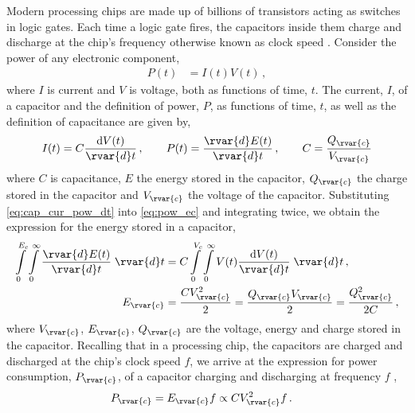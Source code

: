 Modern processing chips are made up of billions of transistors acting as switches in logic gates. Each time a logic gate fires, the capacitors inside them charge and discharge at the chip's frequency otherwise known as clock speed \cite{cpu_trnstor}. Consider the power of any electronic component,
\begin{align}\label{eq:pow_ec}
  P(t) & = I(t) V(t) \,,
\end{align}
where $ I $ is current and $ V $ is voltage, both as functions of time, $t$. The current, $ I $, of a capacitor and the definition of power, $ P $, as functions of time, $ t $, as well as the definition of capacitance are given by,
\begin{align}\label{eq:cap_cur_pow_dt}
  I(t) = C \dfrac{\mathrm{d}V(t)}{\rvar{d}t} \,, \qquad
  P(t) = \dfrac{\rvar{d}E(t)}{\rvar{d}t}\,, \qquad
  C = \dfrac{Q_\rvar{c}}{V_\rvar{c}}
\end{align}
where $ C $ is capacitance, $ E $ the energy stored in the capacitor, $Q_\rvar{c}$ the charge stored in the capacitor and $V_\rvar{c}$ the voltage of the capacitor. Substituting \cref{eq:cap_cur_pow_dt} into \cref{eq:pow_ec} and integrating twice, we obtain the expression for the energy stored in a capacitor,
\begin{subequations}
  \begin{align}\label{eq:e_cap}
    \int\limits_{0}^{E_{c}}\int\limits_{0}^{\infty} \dfrac{\rvar{d}E(t)}{\rvar{d}t}\; \rvar{d} t & = C \int\limits_{0}^{V_{c}}\int\limits_{0}^{\infty} V(t) \dfrac{\mathrm{d}V(t)}{\rvar{d}t}\; \rvar{d} t\,, \\
    E_{\rvar{c}}                                                                                 & = \dfrac{C V_{\rvar{c}}^{2}}{2}  = \dfrac{Q_\rvar{c} V_\rvar{c}}{2} = \dfrac{Q_\rvar{c}^2}{2C}\,,
  \end{align}
\end{subequations}
where $ V_{\rvar{c}} $, $ E_{\rvar{c}} $, $Q_\rvar{c}$ are the voltage, energy and charge stored in the capacitor. Recalling that in a processing chip, the capacitors are charged and discharged at the chip's clock speed $ f $, we arrive at the expression for power consumption, $ P_{\rvar{c}} $, of a capacitor charging and discharging at frequency $ f $ \cite{microelec},
\begin{align}
  P_{\rvar{c}} & = E_{\rvar{c}} f \propto C V_{\rvar{c}}^{2} f \label{eq:p_cap}\,.
\end{align}

